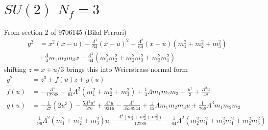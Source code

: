 \documentclass[11pt]{article}
\newcommand{\be}{\begin{equation}}
\newcommand{\ee}{\end{equation}}
\begin{document}
\section{$SU(2)$ $N_{f}=3$}

From section 2 of 9706145 (Bilal-Ferrari)
\be
\begin{split}
	y^{2} &= x^{2}(x-u) - \frac{\Lambda^{2}}{64}(x-u)^{2} -  \frac{\Lambda^{2}}{64}(x-u)(m_{1}^{2}+m_{2}^{2}+m_{3}^{2})  \\
	& + \frac{\Lambda}{4}m_{1}m_{2}m_{3}x - \frac{\Lambda^{2}}{64}(m_{1}^{2}m_{2}^{2} + m_{2}^{2}m_{3}^{2} + m_{3}^{2}m_{1}^{2})
\end{split}
\ee
shifting $z = x + u/3$ brings this into Weierstrass normal form
\be
\begin{split}
	y^{2} & = z^{3} + f(u) z + g(u) \\
	f(u) & = -\frac{\Lambda ^4}{12288}-\frac{1}{64} \Lambda ^2 \left(m_1^2+m_2^2+m_3^2\right)+\frac{1}{4} \Lambda  m_1 m_2 m_3-\frac{u^2}{3}+\frac{\Lambda ^2 u}{48} \\
	g(u) & = -\frac{1}{27} \left(2 u^3\right)-\frac{5 \Lambda ^2 u^2}{576}+\frac{\Lambda ^4 u}{9216}-\frac{\Lambda ^6}{3538944}+\frac{1}{12} \Lambda  m_1 m_2 m_3 u+\frac{1}{768} \Lambda ^3 m_1 m_2 m_3\\
	 & +\frac{1}{96} \Lambda ^2 \left(m_1^2+m_2^2+m_3^2\right) u-\frac{\Lambda ^4 \left(m_1^2+m_2^2+m_3^2\right)}{12288}-\frac{1}{64} \Lambda ^2 \left(m_2^2 m_1^2+ m_{3}^{2}m_1^2+m_2^2 m_3^2\right)
\end{split}
\ee
\end{document}
